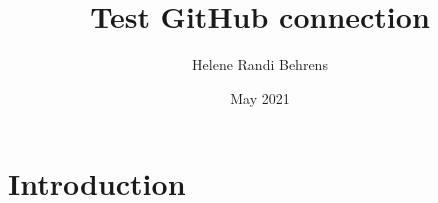\documentclass{article}
\title{Test GitHub connection}
\author{Helene Randi Behrens}
\date{May 2021}
\begin{document}
\maketitle

\section{Introduction}
\end{document}
